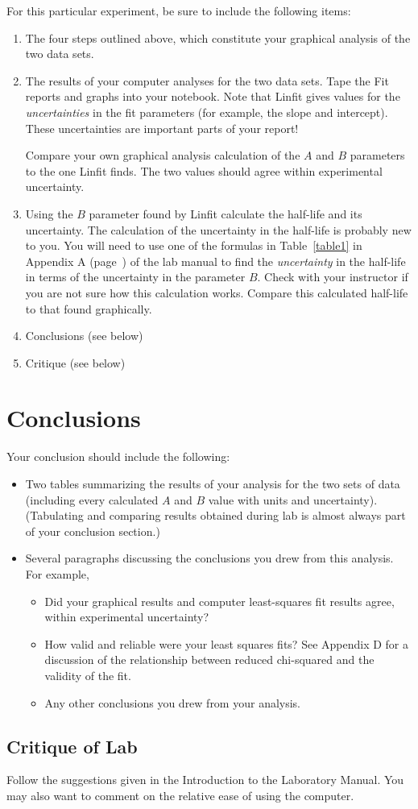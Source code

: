 For this particular experiment, be sure to include the following items:
\begin{enumerate}
\item The four steps outlined above, which constitute your graphical
analysis of the two data sets.
\item The results of your computer analyses for the two data sets.
Tape the Fit reports and graphs into your notebook.
      Note that Linfit gives values for the {\it uncertainties} in
      the fit parameters (for example, the slope and intercept).
      These uncertainties are important parts of your report!  

Compare
       your own graphical analysis calculation of the
$A$ and $B$ parameters to the one Linfit finds.  The two
       values should agree within experimental uncertainty.

\item Using the $B$ parameter found by Linfit calculate the half-life and its
uncertainty. The calculation of the uncertainty in the
       half-life is probably new to you.  You will need to use one
       of the formulas in Table~\ref{table1} in Appendix A
       (page~\pageref{errorprop}) of the lab manual to find the
       {\em uncertainty} in the half-life in terms of the
       uncertainty in the parameter $B$.  
Check with your instructor if you are not
       sure how this calculation works.  Compare this calculated
half-life to that found graphically.

\item Conclusions (see below)
\item Critique (see below)
\end{enumerate}

\section*{Conclusions}
Your conclusion should include the following:
\begin{itemize}
\item Two tables summarizing the results of your analysis for the
two sets of data (including every calculated $A$ and $B$ value
with units and uncertainty).  
(Tabulating and comparing results obtained during lab is almost
always part of your conclusion section.)
%
\item Several paragraphs discussing the conclusions you drew from
this analysis.  For example,
\begin{itemize}
\item Did your graphical results and computer least-squares fit results agree, within
      experimental uncertainty?
%
\item How valid and reliable were your least squares fits?  See Appendix D
for a discussion of the relationship between reduced
chi-squared and the validity of the fit.
%
\item Any other conclusions you drew from your analysis.
\end{itemize}
\end{itemize}


\subsection*{Critique of Lab}
     Follow the suggestions given in the Introduction to the Laboratory Manual.
You may also want to comment on the relative ease of using the
computer.
